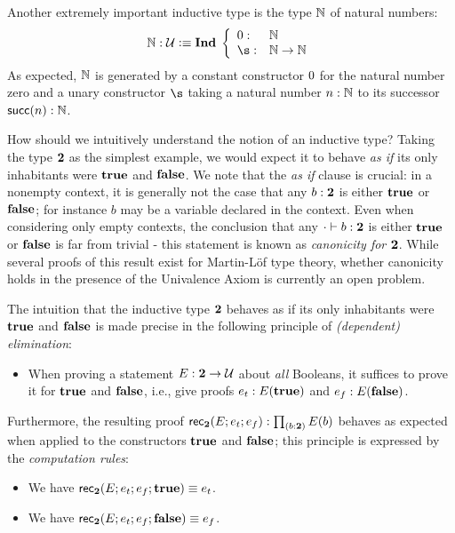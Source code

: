 Another extremely important inductive type is the type $\mathbb{N}$ of natural numbers:  
\[  \nat : \type \defeq \myInd \left\{ 
\begin{array}{ll}
\z : & \nat \\
\s : & \nat \to \nat
\end{array}
\right. \]
As expected, $\mathbb{N}$ is generated by a constant constructor $0$ for the natural number zero and a unary constructor $\s$ taking a natural number $n : \mathbb{N}$ to its successor $\mathsf{succ}(n) : \mathbb{N}$. 

How should we intuitively understand the notion of an inductive type? Taking the type ${\mathbf{2}}$ as the simplest example, we would expect it to behave \emph{as if} its only inhabitants were $\mathbf{true}$ and $\mathbf{false}$. We note that the \emph{as if} clause is crucial: in a nonempty context, it is generally not the case that any $b : {\mathbf{2}}$ is either $\mathbf{true}$ or $\mathbf{false}$; for instance $b$ may be a variable declared in the context. Even when considering only empty contexts, the conclusion that any $\cdot \vdash b : {\mathbf{2}}$ is either $\mathbf{true}$ or $\mathbf{false}$ is far from trivial - this statement is known as \emph{canonicity for ${\mathbf{2}}$}. While several proofs of this result exist for Martin-L{\"o}f type theory, whether canonicity holds in the presence of the Univalence Axiom is currently an open problem.

The intuition that the inductive type ${\mathbf{2}}$ behaves as if its only inhabitants were $\mathbf{true}$ and $\mathbf{false}$ is made precise in the following principle of \emph{(dependent) elimination}:

\begin{itemize}
\item When proving a statement $E : {\mathbf{2}} \to \mathcal{U}$ about \emph{all} Booleans, it suffices to prove it for $\mathbf{true}$ and $\mathbf{false}$, i.e., give proofs
$ e_t : E(\mathbf{true})$ and $e_f : E(\mathbf{false})$.
\end{itemize}

Furthermore, the resulting proof $\rec\two(E;e_t;e_f): \prd{b : \two}E(b)$ behaves as expected when applied to the constructors $\mathbf{true}$ and $\mathbf{false}$; this principle is expressed by the \emph{computation rules}:
\begin{itemize}
\item We have $\mathsf{rec}_{{\mathbf{2}}}(E;e_t;e_f;\mathbf{true}) \equiv e_t$.
\item We have $\mathsf{rec}_{{\mathbf{2}}}(E;e_t;e_f;\mathbf{false}) \equiv e_f$.
\end{itemize}

